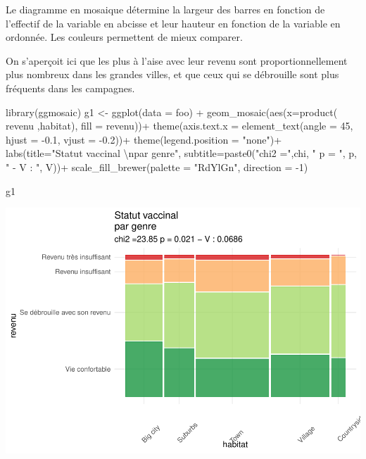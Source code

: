 \documentclass[
]{book}
\newenvironment{Shaded}{\begin{snugshade}}{\end{snugshade}}
\newcommand{\AttributeTok}[1]{\textcolor[rgb]{0.77,0.63,0.00}{#1}}
\newcommand{\DecValTok}[1]{\textcolor[rgb]{0.00,0.00,0.81}{#1}}
\newcommand{\FloatTok}[1]{\textcolor[rgb]{0.00,0.00,0.81}{#1}}
\newcommand{\FunctionTok}[1]{\textcolor[rgb]{0.00,0.00,0.00}{#1}}
\newcommand{\NormalTok}[1]{#1}
\newcommand{\OtherTok}[1]{\textcolor[rgb]{0.56,0.35,0.01}{#1}}
\newcommand{\SpecialCharTok}[1]{\textcolor[rgb]{0.00,0.00,0.00}{#1}}
\newcommand{\StringTok}[1]{\textcolor[rgb]{0.31,0.60,0.02}{#1}}
\begin{document}
Le diagramme en mosaique détermine la largeur des barres en fonction de l'effectif de la variable en abcisse et leur hauteur en fonction de la variable en ordonnée. Les couleurs permettent de mieux comparer.

On s'aperçoit ici que les plus à l'aise avec leur revenu sont proportionnellement plus nombreux dans les grandes villes, et que ceux qui se débrouille sont plus fréquents dans les campagnes.

\begin{Shaded}
\begin{Highlighting}[]
\FunctionTok{library}\NormalTok{(ggmosaic)}
\NormalTok{g1 }\OtherTok{\textless{}{-}} \FunctionTok{ggplot}\NormalTok{(}\AttributeTok{data =}\NormalTok{ foo) }\SpecialCharTok{+}
  \FunctionTok{geom\_mosaic}\NormalTok{(}\FunctionTok{aes}\NormalTok{(}\AttributeTok{x=}\FunctionTok{product}\NormalTok{( revenu ,habitat), }\AttributeTok{fill =}\NormalTok{ revenu))}\SpecialCharTok{+}  
  \FunctionTok{theme}\NormalTok{(}\AttributeTok{axis.text.x =} \FunctionTok{element\_text}\NormalTok{(}\AttributeTok{angle =} \DecValTok{45}\NormalTok{, }\AttributeTok{hjust =} \SpecialCharTok{{-}}\FloatTok{0.1}\NormalTok{, }\AttributeTok{vjust =} \SpecialCharTok{{-}}\FloatTok{0.2}\NormalTok{))}\SpecialCharTok{+} 
  \FunctionTok{theme}\NormalTok{(}\AttributeTok{legend.position =} \StringTok{"none"}\NormalTok{)}\SpecialCharTok{+}
  \FunctionTok{labs}\NormalTok{(}\AttributeTok{title=}\StringTok{"Statut vaccinal }\SpecialCharTok{\textbackslash{}n}\StringTok{par genre"}\NormalTok{, }
       \AttributeTok{subtitle=}\FunctionTok{paste0}\NormalTok{(}\StringTok{"chi2 ="}\NormalTok{,chi, }\StringTok{" p = "}\NormalTok{, p, }\StringTok{" {-} V : "}\NormalTok{, V))}\SpecialCharTok{+}    
  \FunctionTok{scale\_fill\_brewer}\NormalTok{(}\AttributeTok{palette =} \StringTok{"RdYlGn"}\NormalTok{, }\AttributeTok{direction =} \SpecialCharTok{{-}}\DecValTok{1}\NormalTok{) }

\NormalTok{g1}
\end{Highlighting}
\end{Shaded}

\includegraphics{bookdown-demo_files/figure-latex/0428-1.pdf}
\end{document}
